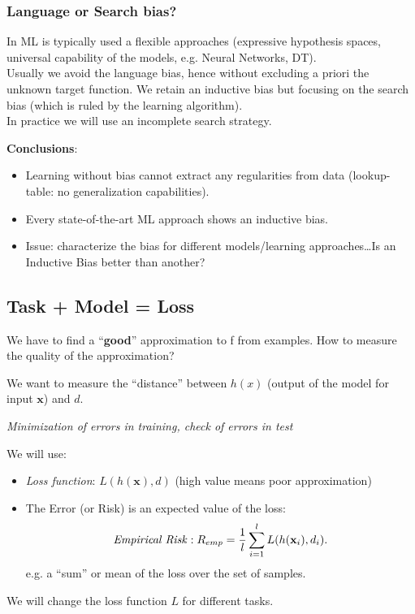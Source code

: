\documentclass[../main.tex]{subfiles}
\begin{document}
\subsubsection{Language or Search bias?}%
In ML is typically used a flexible approaches (expressive hypothesis spaces, universal capability of the models, e.g. Neural Networks, DT).\\
Usually we avoid the language bias, hence without excluding a priori the unknown target function. We retain an inductive bias but focusing on the search bias (which is ruled by the learning algorithm).\\
In practice we will use an incomplete search strategy.

\textbf{Conclusions}:
\begin{itemize}
    \item Learning without bias cannot extract any regularities from data (lookup-table: no generalization capabilities).
    \item Every state-of-the-art ML approach shows an inductive bias.
    \item Issue: characterize the bias for different models/learning approaches\ldots Is an Inductive Bias better than another?
\end{itemize}

\subsection{Task + Model = Loss}
We have to find a  “\textbf{good}” approximation to f from examples. How to measure the quality of the approximation?

\noindent We want to measure the “distance” between $h(x)$ (output of the model for input $\mathbf{x}$) and $d$.
\begin{center}
\textit{Minimization of errors in training, check of errors in test}\\
\end{center}
\noindent We will use:
\begin{itemize}
    \item \emph{Loss function}: $L(h(\textbf{x}),d)$ (high value means poor approximation)
    \item The Error (or Risk) is an expected value of the loss:
	\[
	    \text{\emph{Empirical Risk}}: R_{emp}= \frac{1}{l} \sum_{i=1}^{l} L(h(\textbf{x}_i),d_i)
	.\] 
    e.g. a “sum” or mean of the loss over the set of samples.
\end{itemize}
We will change the loss function $L$ for different tasks.
\end{document}
